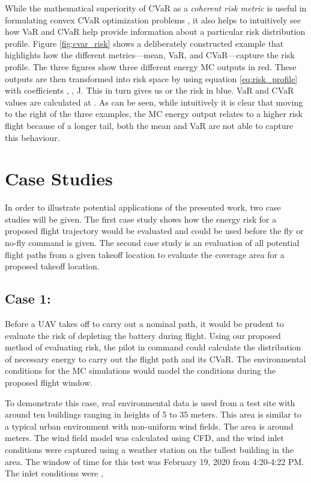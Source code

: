 \documentclass[letterpaper, 10 pt, conference]{ieeeconf}
\begin{document}
While the mathematical superiority of CVaR as a \textit{coherent risk metric} \cite{majumdar2020should} is useful in formulating convex CVaR optimization problems \cite{rockafellar2000optimization}, it also helps to intuitively see how VaR and CVaR help provide information about a particular risk distribution profile. Figure \ref{fig:cvar_risk} shows a deliberately constructed example that highlights how the different metrics---mean, VaR, and CVaR---capture the risk profile. The three figures show three different energy MC outputs in red. These outputs are then transformed into risk space by using equation \ref{eq:risk_profile} with coefficients , ,  J. This in turn gives us  or the risk  in blue. VaR and CVaR values are calculated at . As can be seen, while intuitively it is clear that moving to the right of the three examples, the MC energy output relates to a higher risk flight because of a longer tail, both the mean and VaR are not able to capture this behaviour. 


\section{Case Studies}
\label{sec:case_studies}

In order to illustrate potential applications of the presented work, two case studies will be given. The first case study shows how the energy risk for a proposed flight trajectory would be evaluated and could be used before the fly or no-fly command is given. The second case study is an evaluation of all potential flight paths from a given takeoff location to evaluate the coverage area for a proposed takeoff location. 





\subsection{Case 1: }
Before a UAV takes off to carry out a nominal path, it would be prudent to evaluate the risk of depleting the battery during flight. Using our proposed method of evaluating risk, the pilot in command could calculate the distribution of necessary energy to carry out the flight path and its CVaR. The environmental conditions for the MC simulations would model the conditions during the proposed flight window.

To demonstrate this case, real environmental data is used from a test site with around ten buildings ranging in heights of 5 to 35 meters. This area is similar to a typical urban environment with non-uniform wind fields. The area is around  meters. The wind field model was calculated using CFD, and the wind inlet conditions were captured using a weather station on the tallest building in the area. The window of time for this test was February 19, 2020 from 4:20-4:22 PM. The inlet conditions were , 
\end{document}

